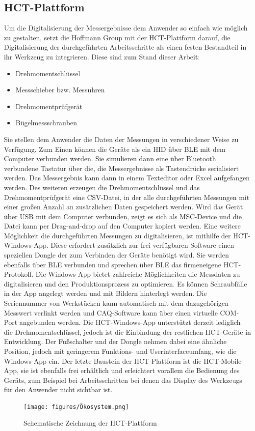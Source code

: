 \subsection{HCT-Plattform}
Um die Digitalisierung der Messergebnisse dem Anwender so einfach wie möglich zu gestalten, setzt die Hoffmann Group mit der \ac{HCT}-Plattform darauf, die Digitalisierung der durchgeführten Arbeitsschritte als einen festen Bestandteil in ihr Werkzeug zu integrieren. Diese sind zum Stand dieser Arbeit: 
\begin{itemize}
	\item Drehmomentschlüssel
	\item Messschieber bzw. Messuhren
	\item Drehmomentprüfgerät
	\item Bügelmessschrauben
\end{itemize}
Sie stellen dem Anwender die Daten der Messungen in verschiedener Weise zu Verfügung. Zum Einen können die Geräte als ein \ac{HID} über \ac{BLE} mit dem Computer verbunden werden. Sie simulieren dann eine über Bluetooth verbundene Tastatur über die, die Messergebnisse als Tastendrücke serialisiert werden. Das Messergebnis kann dann in einem Texteditor oder Excel aufgefangen werden. Des weiteren erzeugen die Drehmomentschlüssel und das Drehmomentprüfgerät eine \ac{CSV}-Datei, in der alle durchgeführten Messungen mit einer großen Anzahl an zusätzlichen Daten gespeichert werden. Wird das Gerät über \ac{USB} mit dem Computer verbunden, zeigt es sich als \ac{MSC}-Device und die Datei kann per Drag-and-drop auf den Computer kopiert werden. Eine weitere Möglichkeit die durchgeführten Messungen zu digitalisieren, ist mithilfe der \ac{HCT}-Windows-App. Diese erfordert zusätzlich zur frei verfügbaren Software einen speziellen Dongle der zum Verbinden der Geräte benötigt wird. Sie werden ebenfalls über \ac{BLE} verbunden und sprechen über \ac{BLE} das firmeneigene \ac{HCT}-Protokoll. Die Windows-App bietet zahlreiche Möglichkeiten die Messdaten zu digitalisieren und den Produktionsprozess zu optimieren. Es können Schraubfälle in der App angelegt werden und mit Bildern hinterlegt werden. Die Seriennummer von Werkstücken kann automatisch mit dem dazugehörigen Messwert verlinkt werden und \ac{CAQ}-Software kann über einen virtuelle COM-Port angebunden werden. Die \ac{HCT}-Windows-App unterstützt derzeit lediglich die Drehmomentschlüssel, jedoch ist die Einbindung der restlichen \ac{HCT}-Geräte in Entwicklung. Der Fußschalter und der Dongle nehmen dabei eine ähnliche Position, jedoch mit geringerem Funktions- und Userinterfaceumfang, wie die Windows-App ein. Der letzte Baustein der \ac{HCT}-Plattform ist die \ac{HCT}-Mobile-App, sie ist ebenfalls frei erhältlich und erleichtert vorallem die Bedienung des Geräts, zum Beispiel bei Arbeitsschritten bei denen das Display des Werkzeugs für den Anwender nicht sichtbar ist.
\begin{figure}[H] 
	\centering
	\texttt{[image: figures/Ökosystem.png]}
	\caption{Schematische Zeichnung der \ac{HCT}-Plattform}
\end{figure}

